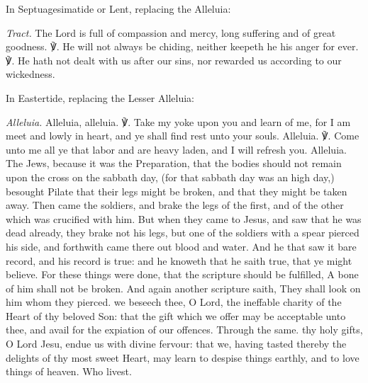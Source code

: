 

\begin{rubric}
{In Septuagesimatide or Lent, replacing the Alleluia:}
\end{rubric}\par\noindent
\textit{Tract.} The Lord is full of compassion and mercy, long suffering and of great goodness. ℣. He will not always be chiding, neither keepeth he his anger for ever. ℣. He hath not dealt with us after our sins, nor rewarded us according to our wickedness.

\begin{rubric}
{In Eastertide, replacing the Lesser Alleluia:}
\end{rubric}\par\noindent
\textit{Alleluia.} Alleluia, alleluia. ℣. Take my yoke upon you and learn of me, for I am meet and lowly in heart, and ye shall find rest unto your souls. Alleluia. ℣. Come unto me all ye that labor and are heavy laden, and I will refresh you. Alleluia.
 The Jews, because it was the Preparation, that the bodies should not remain upon the cross on the sabbath day, (for that sabbath day was an high day,) besought Pilate that their legs might be broken, and that they might be taken away. Then came the soldiers, and brake the legs of the first, and of the other which was crucified with him. But when they came to Jesus, and saw that he was dead already, they brake not his legs, but one of the soldiers with a spear pierced his side, and forthwith came there out blood and water. And he that saw it bare record, and his record is true: and he knoweth that he saith true, that ye might believe. For these things were done, that the scripture should be fulfilled, A bone of him shall not be broken. And again another scripture saith, They shall look on him whom they pierced.
\secret
{} we beseech thee, O Lord, the ineffable charity of the Heart of thy beloved Son: that the gift which we offer may be acceptable unto thee, and avail for the expiation of our offences. Through the same.
\postcommunion
{} thy holy gifts, O Lord Jesu, endue us with divine fervour: that we, having tasted thereby the delights of thy most sweet Heart, may learn to despise things earthly, and to love things of heaven. Who livest.


